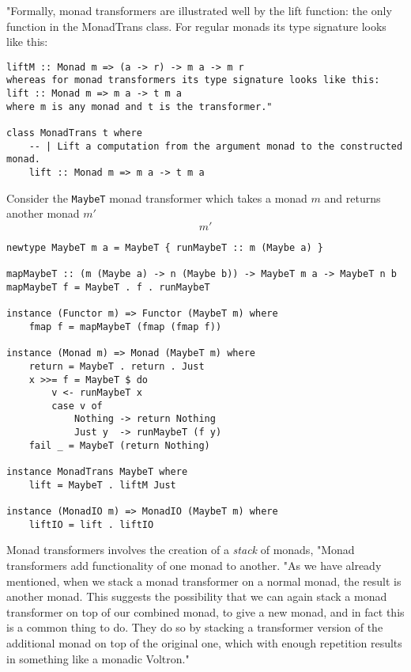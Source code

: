 "Formally, monad transformers are illustrated well by the lift function:
the only function in the MonadTrans class.
For regular monads its type signature looks like this:

\begin{verbatim}
liftM :: Monad m => (a -> r) -> m a -> m r
whereas for monad transformers its type signature looks like this:
lift :: Monad m => m a -> t m a
where m is any monad and t is the transformer."

class MonadTrans t where
    -- | Lift a computation from the argument monad to the constructed monad.
    lift :: Monad m => m a -> t m a
\end{verbatim}

Consider the \texttt{MaybeT} monad transformer
which takes a monad $m$ and returns another monad $m\prime$
\begin{equation}
    m\prime
\end{equation}

\begin{verbatim}
newtype MaybeT m a = MaybeT { runMaybeT :: m (Maybe a) }

mapMaybeT :: (m (Maybe a) -> n (Maybe b)) -> MaybeT m a -> MaybeT n b
mapMaybeT f = MaybeT . f . runMaybeT

instance (Functor m) => Functor (MaybeT m) where
    fmap f = mapMaybeT (fmap (fmap f))

instance (Monad m) => Monad (MaybeT m) where
    return = MaybeT . return . Just
    x >>= f = MaybeT $ do
        v <- runMaybeT x
        case v of
            Nothing -> return Nothing
            Just y  -> runMaybeT (f y)
    fail _ = MaybeT (return Nothing)

instance MonadTrans MaybeT where
    lift = MaybeT . liftM Just

instance (MonadIO m) => MonadIO (MaybeT m) where
    liftIO = lift . liftIO
\end{verbatim}

Monad transformers involves
the creation of a \textit{stack} of monads,
"Monad transformers add functionality of one monad to another.
"As we have already mentioned, when we stack a monad transformer on a normal monad,
the result is another monad.
This suggests the possibility that we can again stack a monad transformer on top of our combined monad,
to give a new monad,
and in fact this is a common thing to do.
They do so by stacking a transformer version of the additional monad
on top of the original one, which with enough repetition results in something like a monadic Voltron."

